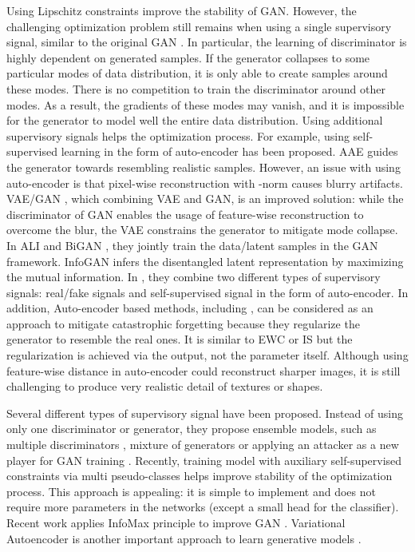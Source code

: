 \documentclass{article}
\begin{document}
Using Lipschitz constraints improve the stability of GAN. However, the challenging optimization problem still remains when using a single supervisory signal, similar to the  original GAN \cite{goodfellow-nisp-2014}. In particular, the learning of discriminator is highly dependent on generated samples. If the generator collapses to some particular modes of data distribution, it is only able to create samples around these modes. 
There is no competition to train the discriminator around other modes. As a result, the gradients of these modes may vanish, and it is impossible for the generator to model well the entire data distribution. Using additional supervisory signals helps the optimization process. For example, using self-supervised learning in the form of auto-encoder has been proposed. AAE \cite{makhzani-arxiv-2015} guides the generator towards resembling realistic samples. 
However, an issue with using auto-encoder is that pixel-wise reconstruction with -norm causes blurry artifacts. VAE/GAN \cite{larsen-arxiv-2015}, which combining  VAE \cite{kingma-arxiv-2013} and GAN, is an improved solution: while the discriminator of GAN enables the usage of feature-wise reconstruction to overcome the blur, the VAE constrains the generator to mitigate mode collapse. In ALI \cite{dumoulin-arxiv-2016} and BiGAN \cite{donahue-arxiv-2016}, they jointly train the data/latent samples in the GAN framework. InfoGAN \cite{chen-arxiv-2016} infers the disentangled latent representation by maximizing the mutual information. In \cite{tran-eccv-2018,tran-aaai-2018}, they  combine two different types of supervisory signals: real/fake signals and self-supervised signal in the form of auto-encoder.  In addition, Auto-encoder based methods, including \cite{larsen-arxiv-2015,tran-eccv-2018,tran-aaai-2018},  can be considered as an approach  to mitigate catastrophic forgetting because they  regularize the generator to resemble the real ones. It is similar to EWC \cite{kirkpatrick-2017-nas} or IS \cite{zenke-arxiv-2017} but the regularization is achieved via the output, not the parameter itself. Although using feature-wise distance in auto-encoder could reconstruct sharper images, it is  still challenging to produce very realistic detail of textures or shapes.

Several different types of supervisory signal have been proposed. Instead of using only one discriminator or generator, they propose ensemble models, such as multiple discriminators \cite{tu-nips-2017}, mixture of generators \cite{hoang-arxiv-2018,ghosh-cvpr-2018} or applying an attacker as a new player for GAN training \cite{liu-cvpr-2019}. Recently, training model with auxiliary self-supervised constraints \cite{chen-arxiv-2018,tran-arxiv-2019} via multi pseudo-classes \cite{gidaris-iclr-2018} helps improve stability of the  optimization process. This approach is appealing: it is simple to implement and does not require more parameters in the networks (except a small head for the classifier).
Recent work applies InfoMax principle to improve GAN \cite{kwotsin:2019}.  Variational Autoencoder is  another important approach to learn generative models \cite{kingma-arxiv-2013,Yang_2019_ICCV}.
\end{document}
